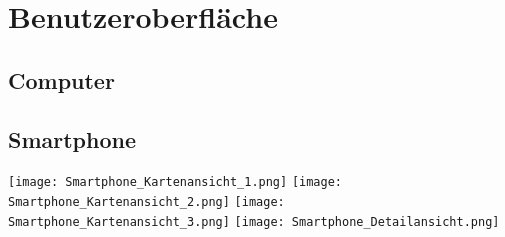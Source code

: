 \section{Benutzeroberfläche}

\subsection{Computer}
\noindent{}
\noindent{}

\subsection{Smartphone}
\begin{center}
    \texttt{[image: Smartphone\_Kartenansicht\_1.png]}
    \newpage
    \texttt{[image: Smartphone\_Kartenansicht\_2.png]}
    \newpage
    \texttt{[image: Smartphone\_Kartenansicht\_3.png]}
    \newpage
    \texttt{[image: Smartphone\_Detailansicht.png]}
\end{center}
